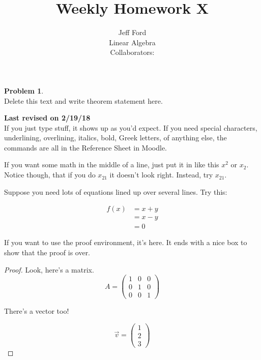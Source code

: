 \documentclass[12 pt]{article}
\theoremstyle{definition}
\newtheorem*{prob}{Problem}
\newcommand\m[1]{\begin{pmatrix}#1\end{pmatrix}}
\newcommand\rev[1]{\noindent\textbf{Last revised on {#1}}\\}
\begin{document}
 
 
\title{Weekly Homework X}%
\author{Jeff Ford\\ %
Linear Algebra\\
Collaborators: } %
 
\maketitle
 
\begin{prob}\\ 
Delete this text and write theorem statement here.
\end{prob}
\rev{2/19/18} %

If you just type stuff, it shows up as you'd expect. If you need special characters, underlining, overlining, italics, bold, Greek letters, of anything else, the commands are all in the Reference Sheet in Moodle.

If you want some math in the middle of a line, just put it in like this $x^2$ or $x_2$. Notice though, that if you do $x_21$ it doesn't look right. Instead, try $x_{21}$.

Suppose you need lots of equations lined up over several lines. Try this:

\begin{align*}
f(x) &= x+y\\
&= x-y\\
&=0
\end{align*}

If you want to use the proof environment, it's here. It ends with a nice box to show that the proof is over.

\begin{proof}
Look, here's a matrix.
$$A = \m{1&0&0\\0&1&0\\0&0&1}$$

There's a vector too!

$$\vec{v} = \m{1\\2\\3}$$
\end{proof}

 
\end{document}
